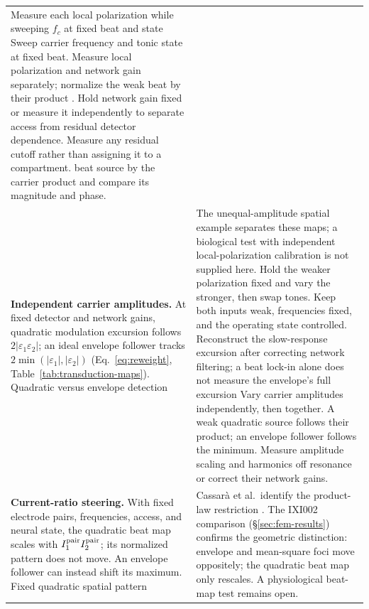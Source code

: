 \documentclass[11pt,a4paper]{article}
\providecommand{\DIFaddtex}[1]{{\protect\color{blue} \sf #1}} %
\providecommand{\DIFdeltex}[1]{{\protect\color{red} \scriptsize #1}} %
\providecommand{\DIFaddFL}[1]{\DIFadd{#1}} %
\providecommand{\DIFdelFL}[1]{\DIFdel{#1}} %
\providecommand{\DIFaddbeginFL}{} %
\providecommand{\DIFaddendFL}{} %
\providecommand{\DIFdelbeginFL}{} %
\providecommand{\DIFdelendFL}{} %
\providecommand{\DIFadd}[1]{\texorpdfstring{\DIFaddtex{#1}}{#1}} %
\providecommand{\DIFdel}[1]{\texorpdfstring{\DIFdeltex{#1}}{}} %
\begin{document}
\begin{table}[htbp]
\begin{tabular}{@{}>{\raggedright\arraybackslash}p{}
 >{\raggedright\arraybackslash}p{}@{}}
{hippocampal oscillations \cite{esmaeilpour2020}.
}%
\DIFdelFL{Measure each local polarization while sweeping $f_c$ at fixed beat and state}\DIFdelendFL \DIFaddbeginFL \DIFaddFL{Sweep carrier frequency and tonic state at fixed
beat. Measure local polarization and network gain separately}\DIFaddendFL ; normalize the
\DIFdelbeginFL \DIFdelFL{weak beat by their product . Hold network gain fixed or measure it
independently to separate access from residual detector dependence. Measure any
residual cutoff rather than assigning it to a compartment. }\DIFdelendFL \DIFaddbeginFL \DIFaddFL{beat source by the carrier product and compare its magnitude and phase. }\DIFaddendFL \\[4pt]
\DIFdelbeginFL \DIFdelFL{\textbf{Independent carrier amplitudes.} At fixed detector and network gains,
quadratic modulation excursion follows $2|\varepsilon_1\varepsilon_2|$; an ideal envelope
follower tracks $2\min(|\varepsilon_1|,|\varepsilon_2|)$
(Eq.~\eqref{eq:reweight}, Table~\ref{tab:transduction-maps}).
}\DIFdelendFL \DIFaddbeginFL \DIFaddFL{Quadratic versus envelope detection }\DIFaddendFL & \DIFdelbeginFL \DIFdelFL{The unequal-amplitude spatial example separates these maps; a biological test
with independent local-polarization calibration is not supplied here.
}%
\DIFdelFL{Hold the weaker polarization fixed and vary the stronger, then swap tones. Keep both inputs weak, frequencies fixed, and the operating state controlled.
Reconstruct the slow-response excursion after correcting network filtering;
a beat lock-in alone does not measure the envelope's full excursion}\DIFdelendFL \DIFaddbeginFL \DIFaddFL{Vary carrier amplitudes independently,
then together. A weak quadratic source follows their product; an envelope
follower follows the minimum. Measure amplitude scaling and harmonics off
resonance or correct their network gains}\DIFaddendFL . \\[4pt]
\DIFdelbeginFL \DIFdelFL{\textbf{Current-ratio steering.} With fixed electrode pairs, frequencies,
access, and neural state, the quadratic beat map scales with
$I_1^{\rm pair}I_2^{\rm pair}$; its normalized pattern does not move.
An envelope follower can instead shift its maximum.
}\DIFdelendFL \DIFaddbeginFL \DIFaddFL{Fixed quadratic spatial pattern }\DIFaddendFL & \DIFdelbeginFL \DIFdelFL{Cassar\`a et al.\ identify the product-law restriction
\cite{cassara2025part2}. The IXI002 comparison (\S\ref{sec:fem-results}) confirms
the geometric distinction: envelope and mean-square foci move oppositely;
the quadratic beat map only rescales. A physiological beat-map test remains open.
}
\end{tabular}
\end{table}
\end{document}
